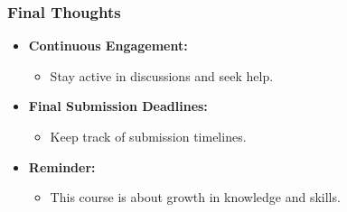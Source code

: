 \documentclass{beamer}
\begin{document}
\begin{frame}[fragile]
    \frametitle{Final Thoughts}
    \begin{itemize}
        \item \textbf{Continuous Engagement:}
          \begin{itemize}
              \item Stay active in discussions and seek help.
          \end{itemize}
          
        \item \textbf{Final Submission Deadlines:}
          \begin{itemize}
              \item Keep track of submission timelines.
          \end{itemize}
          
        \item \textbf{Reminder:}
          \begin{itemize}
              \item This course is about growth in knowledge and skills.
          \end{itemize}
    \end{itemize}
\end{frame}
\end{document}
